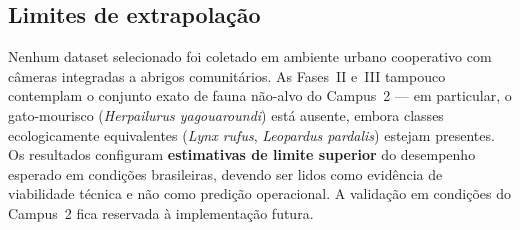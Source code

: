 \subsection*{Limites de extrapolação}
Nenhum dataset selecionado foi coletado em ambiente urbano cooperativo com câmeras integradas a abrigos comunitários. As Fases~II e~III tampouco contemplam o conjunto exato de fauna não-alvo do Campus~2 --- em particular, o gato-mourisco (\emph{Herpailurus yagouaroundi}) está ausente, embora classes ecologicamente equivalentes (\emph{Lynx rufus}, \emph{Leopardus pardalis}) estejam presentes. Os resultados configuram \textbf{estimativas de limite superior} do desempenho esperado em condições brasileiras, devendo ser lidos como evidência de viabilidade técnica e não como predição operacional. A validação em condições do Campus~2 fica reservada à implementação futura.
